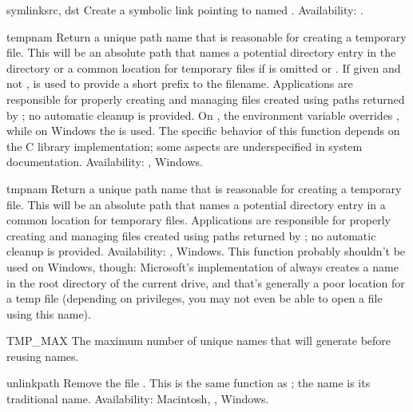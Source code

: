 \begin{funcdesc}{symlink}{src, dst}
Create a symbolic link pointing to  named .
Availability: \UNIX.
\end{funcdesc}

\begin{funcdesc}{tempnam}{}
Return a unique path name that is reasonable for creating a temporary
file.  This will be an absolute path that names a potential directory
entry in the directory  or a common location for temporary
files if  is omitted or .  If given and not
,  is used to provide a short prefix to the
filename.  Applications are responsible for properly creating and
managing files created using paths returned by ;
no automatic cleanup is provided.
On \UNIX, the environment variable  overrides
, while on Windows the  is used.  The specific
behavior of this function depends on the C library implementation;
some aspects are underspecified in system documentation.
Availability: \UNIX, Windows.
\end{funcdesc}

\begin{funcdesc}{tmpnam}{}
Return a unique path name that is reasonable for creating a temporary
file.  This will be an absolute path that names a potential directory
entry in a common location for temporary files.  Applications are
responsible for properly creating and managing files created using
paths returned by ; no automatic cleanup is
provided.
Availability: \UNIX, Windows.  This function probably shouldn't be used
on Windows, though:  Microsoft's implementation of 
always creates a name in the root directory of the current drive, and
that's generally a poor location for a temp file (depending on
privileges, you may not even be able to open a file using this name).
\end{funcdesc}

\begin{datadesc}{TMP_MAX}
The maximum number of unique names that  will
generate before reusing names.
\end{datadesc}

\begin{funcdesc}{unlink}{path}
Remove the file .  This is the same function as
; the  name is its traditional
\UNIX{} name.
Availability: Macintosh, \UNIX, Windows.
\end{funcdesc}

